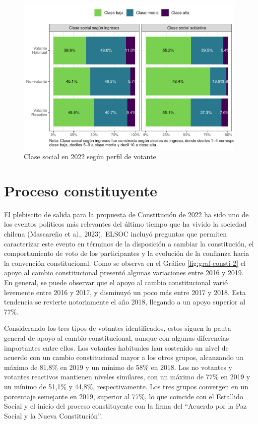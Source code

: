 \documentclass[
  12pt,
]{book}
\begin{document}
\begin{figure}

{\centering \includegraphics{reporte-elsoc_files/figure-latex/graf-clase-subj-ingreso-1} 

}

\caption{Clase social en 2022 según perfil de votante}\label{fig:graf-clase-subj-ingreso}
\end{figure}

\hypertarget{proceso-constituyente}{%
\section{Proceso constituyente}\label{proceso-constituyente}}

El plebiscito de salida para la propuesta de Constitución de 2022 ha sido uno de los eventos políticos más relevantes del último tiempo que ha vivido la sociedad chilena (Mascareño et al., 2023). ELSOC incluyó preguntas que permiten caracterizar este evento en términos de la disposición a cambiar la constitución, el comportamiento de voto de los participantes y la evolución de la confianza hacia la convención constitucional. Como se observa en el Gráfico \ref{fig:graf-consti-2} el apoyo al cambio constitucional presentó algunas variaciones entre 2016 y 2019. En general, se puede observar que el apoyo al cambio constitucional varió levemente entre 2016 y 2017, y disminuyó un poco más entre 2017 y 2018. Esta tendencia se revierte notoriamente el año 2018, llegando a un apoyo superior al 77\%.

Considerando los tres tipos de votantes identificados, estos siguen la pauta general de apoyo al cambio constitucional, aunque con algunas diferencias importantes entre ellos. Los votantes habituales han sostenido un nivel de acuerdo con un cambio constitucional mayor a los otros grupos, alcanzando un máximo de 81,8\% en 2019 y un mínimo de 58\% en 2018. Los no votantes y votantes reactivos mantienen niveles similares, con un máximo de 77\% en 2019 y un mínimo de 51,1\% y 44,8\%, respectivamente. Los tres grupos convergen en un porcentaje semejante en 2019, superior al 77\%, lo que coincide con el Estallido Social y el inicio del proceso constituyente con la firma del ``Acuerdo por la Paz Social y la Nueva Constitución''.
\end{document}
